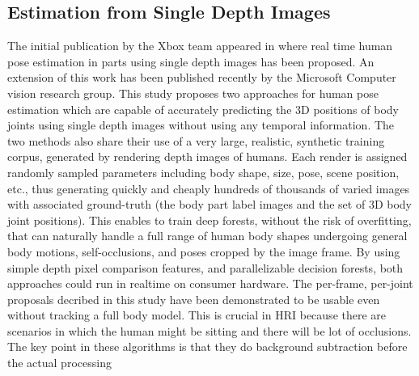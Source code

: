 \subsection{Estimation from Single Depth Images}
 The initial publication by the Xbox\cite{Kinect2014} team appeared in \cite{Shotton2011} where real time human pose estimation in parts using single depth images has been proposed. An extension of this work has been published recently by the Microsoft Computer vision research group\cite{Shotton2013}. This study proposes two approaches for human pose estimation which are capable of accurately predicting the 3D positions of body joints using single depth images without using any temporal information. The two methods also share their use of a very large, realistic, synthetic training corpus, generated by rendering depth images of humans. Each render is assigned randomly sampled parameters including body shape, size, pose, scene position, etc., thus generating quickly and cheaply hundreds of thousands of varied images with associated ground-truth (the body part label images and the set of 3D body joint positions). This enables to train deep forests, without the risk of overfitting, that can naturally handle a full range of human body shapes undergoing general body motions, self-occlusions, and poses cropped by the image frame. By using simple depth pixel comparison features, and parallelizable decision forests, both approaches could run in realtime on consumer hardware. The per-frame, per-joint proposals decribed in this study have been demonstrated to be usable even without tracking a full body model. This is crucial in HRI because there are scenarios in which the human might be sitting and there will be lot of occlusions. The key point in these algorithms is that they do background subtraction before the actual processing 
